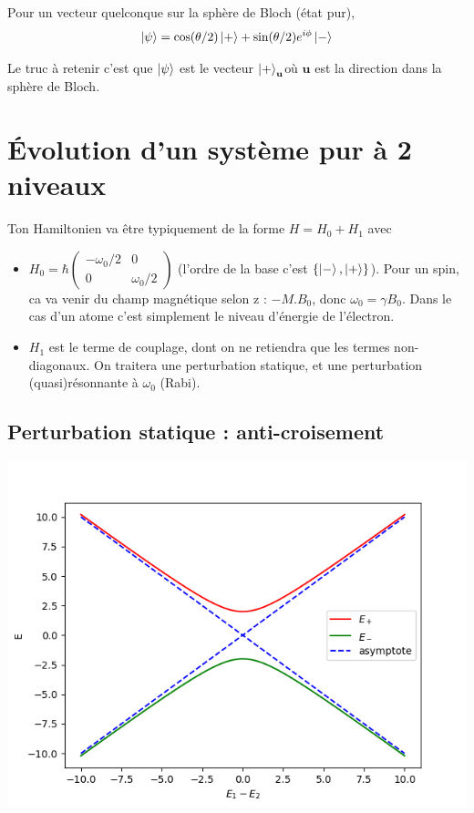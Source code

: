 \documentclass[a4paper]{report}
\begin{document}
  Pour un vecteur quelconque sur la sphère de Bloch (état pur), \begin{equation}
  \ket{\psi}=\cos (\theta/2)\ket{+}+\sin (\theta/2)e^{i \phi} \ket{-}
  \end{equation}
  
  Le truc à retenir c'est que $\ket{\psi}$ est le vecteur $\ket{+}_\textbf{u}$où $\textbf{u}$ est la direction dans la sphère de Bloch.
  
  \section{Évolution d'un système pur à 2 niveaux}
  Ton Hamiltonien va être typiquement de la forme $H=H_0 +H_1$ avec
  \begin{itemize}
  \item $H_0=\hbar \begin{pmatrix} -\omega_0/2 & 0 \\ 0 & \omega_0/2  \end{pmatrix}$ (l'ordre de la base c'est $\{\ket{-},\ket{+}\}$). Pour un spin, ca va venir du champ magnétique selon z : $-M.B_0$, donc $\omega_0=\gamma B_0$. Dans le cas d'un atome c'est simplement le niveau d'énergie de l'électron.
  \item $H_1$ est le terme de couplage, dont on ne retiendra que les termes non-diagonaux. On traitera une perturbation statique, et une perturbation (quasi)résonnante à $\omega_0$ (Rabi).
  \end{itemize}
   \subsection{Perturbation statique : anti-croisement}
   \includegraphics[width=\textwidth]{anti_croisement}
   
\end{document}
